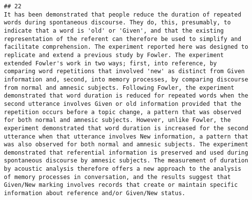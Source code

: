 \documentclass[
  english,
  man]{apa6}
\begin{document}
\begin{verbatim}
## 22                                                                                                                                                                                                                                                                                                                                                                                                                                                                                                                                                                                                                                                                                                                                                                                                                                                                                                                                                                                                                                                    It has been demonstrated that people reduce the duration of repeated words during spontaneous discourse. They do, this, presumably, to indicate that a word is 'old' or 'Given', and that the existing representation of the referent can therefore be used to simplify and facilitate comprehension. The experiment reported here was designed to replicate and extend a previous study by Fowler. The experiment extended Fowler's work in two ways; first, into reference, by comparing word repetitions that involved 'new' as distinct from Given information and, second, into memory processes, by comparing discourse from normal and amnesic subjects. Following Fowler, the experiment demonstrated that word duration is reduced for repeated words when the second utterance involves Given or old information provided that the repetition occurs before a topic change, a pattern that was observed for both normal and amnesic subjects. However, unlike Fowler, the experiment demonstrated that word duration is increased for the second utterance when that utterance involves New information, a pattern that was also observed for both normal and amnesic subjects. The experiment demonstrated that referential information is preserved and used during spontaneous discourse by amnesic subjects. The measurement of duration by acoustic analysis therefore offers a new approach to the analysis of memory processes in conversation, and the results suggest that Given/New marking involves records that create or maintain specific information about reference and/or Given/New status.

\end{verbatim}
\end{document}
